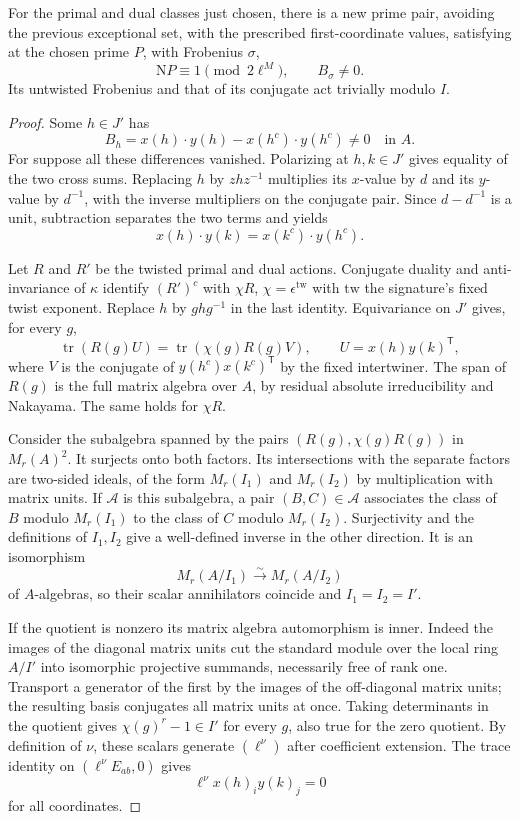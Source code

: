 \begin{lemma}
For the primal and dual classes just chosen, there is a new prime
pair, avoiding the previous exceptional set, with the prescribed first-coordinate values, satisfying at the chosen prime \(P\), with Frobenius \(\sigma\),
\[
 \mathrm NP\equiv1\pmod{2\ell^M},\qquad B_\sigma\ne0.
\] Its untwisted Frobenius and that
of its conjugate act trivially modulo \(I\).
\end{lemma}
\begin{proof}
Some \(h\in J'\) has
\[
 B_h=x(h)\cdot y(h)-x(h^c)\cdot y(h^c)\ne0\quad\text{in } A .
\]
For suppose all these differences vanished. Polarizing at
\(h,k\in J'\) gives equality of the two cross sums. Replacing
\(h\) by \(zhz^{-1}\) multiplies its \(x\)-value by \(d\)
and its \(y\)-value by \(d^{-1}\), with the inverse multipliers
on the conjugate pair. Since \(d-d^{-1}\) is a unit, subtraction
separates the two terms and yields
\[
            x(h)\cdot y(k)=x(k^c)\cdot y(h^c).
\]

Let \(R\) and \(R'\) be the twisted primal and dual actions.
Conjugate duality and anti-invariance of \(\kappa\) identify
\((R')^c\) with \(\chi R\), \(\chi=\epsilon^{\text{tw}}\) with \(\text{tw}\) the
signature's fixed twist exponent.
Replace \(h\) by \(ghg^{-1}\) in the last identity.
Equivariance on \(J'\) gives, for every \(g\),
\[
 \operatorname{tr}(R(g)U)=\operatorname{tr}(\chi(g)R(g)V),
 \qquad U=x(h)y(k)^{\mathsf T},
\]
where \(V\) is the conjugate of \(y(h^c)x(k^c)^{\mathsf T}\)
by the fixed intertwiner. The span of \(R(g)\) is the full
matrix algebra over \(A\), by residual absolute irreducibility
and Nakayama. The same holds for \(\chi R\).

Consider the subalgebra spanned by the pairs \((R(g),\chi(g)R(g))\) in
\(M_r(A)^2\). It surjects onto both factors. Its intersections
with the separate factors are two-sided ideals, of the form
\(M_r(I_1)\) and \(M_r(I_2)\) by multiplication with matrix
units. If \(\mathcal A\) is this subalgebra, a pair \((B,C)\in\mathcal A\)
associates the class of \(B\) modulo \(M_r(I_1)\) to the class
of \(C\) modulo \(M_r(I_2)\). Surjectivity and the definitions
of \(I_1,I_2\) give a well-defined inverse in the other direction.
It is an isomorphism
\[
      M_r(A/I_1)\xrightarrow{\sim} M_r(A/I_2)
\]
of \(A\)-algebras, so their scalar annihilators coincide and
\(I_1=I_2=I'\).

If the quotient is nonzero its matrix algebra
automorphism is inner. Indeed the images of the diagonal matrix
units cut the standard module over the local ring \(A/I'\)
into isomorphic projective summands, necessarily free of rank
one. Transport a generator of the first by the images of the
off-diagonal matrix units; the resulting basis conjugates
all matrix units at once. Taking determinants in the quotient
gives \(\chi(g)^r-1\in I'\) for every \(g\), also true for the
zero quotient. By definition of \(\nu\), these scalars generate
\((\ell^\nu)\) after coefficient extension. The trace identity
on \((\ell^\nu E_{ab},0)\) gives
\[
 \ell^\nu x(h)_i y(k)_j=0
\]
for all coordinates.


\end{proof}

